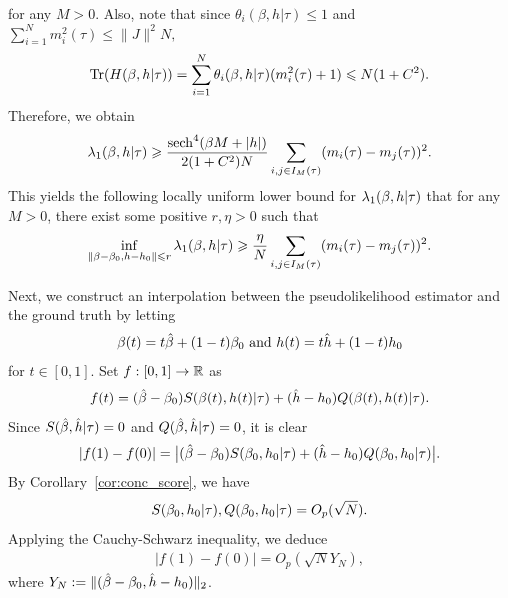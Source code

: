 \documentclass[letterpaper,11pt,reqno]{amsart}
\renewcommand{\le}{\leqslant}
\renewcommand{\ge}{\geqslant}
\renewcommand{\leq}{\leqslant}
\newcommand{\norm}[1]{\left\Vert#1\right\Vert}
\newcommand{\abs}[1]{\left\vert#1\right\vert}
\newcommand{\mvgt}{{\tau}}
\DeclareMathOperator{\sech}{sech}
\begin{document}
for any $M>0$.  Also, note that 
since $\theta_i(\beta,h|\mvgt)\leq 1$ and $\sum_{i=1}^Nm_i^2(\mvgt)\leq \|J\|^2N,$
\[
\mathrm{Tr}(H(\gb,h |\mvgt)) = \sum_{i=1}^N\theta_i(\gb ,h|\mvgt) (m_i^2(\mvgt)+1)\le N(1+C^2).
\]
Therefore, we obtain 
\begin{align}\label{eq:mineig_bd2}
    \gl_1(\gb, h |\mvgt) \ge \frac{\sech^4( \beta M + |h|)}{2(1+ C^2) N}   \sum_{i, j \in I_M(\mvgt)} (m_i(\mvgt)-m_j(\mvgt))^2.
\end{align}
This yields the following locally uniform lower bound for $\gl_1(\gb, h |\mvgt)$ that for any $M>0$, there exist some positive $r,\eta>0$ such that
\begin{align}\label{eq:mineig_uni_bd}
\inf_{\norm{\gb-\gb_0,h-h_0}\le r} \gl_1(\gb, h|\mvgt) \ge \frac{\eta }{N} \sum_{i, j \in I_M(\mvgt)} (m_i(\mvgt)-m_j(\mvgt))^2.
\end{align}

Next, we construct an interpolation between the pseudolikelihood estimator and the ground truth by letting
\begin{align*}
    \beta(t)= t \hat{\beta} + (1-t)   \beta_0\,\,\mbox{and}\,\, h(t)= t  \hat{h} + (1-t)   h_0
\end{align*}
for $t\in [0,1].$
Set $f:[0,1]\to \mathbb{R}$ as
\begin{align*}
 f(t)= (\hat{\gb} - \gb_0)  S(\gb(t), h(t)|\mvgt) + (\hat{h} - h_0) Q(\gb(t), h(t)|\mvgt) .
\end{align*}
Since $S(\hat{\gb},\hat{h}|\mvgt)=0$ and $Q(\hat{\gb},\hat{h}|\mvgt)=0$, it is clear
\begin{align*}
    \abs{f(1)- f(0)} = \bigl|(\hat{\gb} - \gb_0) S(\gb_0, h_0|\mvgt) + (\hat{h} - h_0) Q(\gb_0, h_0|\mvgt) \bigr|.
\end{align*}
By Corollary~\ref{cor:conc_score}, we have 
\[
S(\gb_0,h_0|\mvgt), Q(\gb_0,h_0|\mvgt) = O_p(\sqrt{N}).
\]
Applying the Cauchy-Schwarz inequality, we deduce 
\begin{align}\label{eq:asy-YN}
\abs{f(1) - f(0)} = O_p(\sqrt{N} Y_N),
\end{align}
where $Y_N:=\|(\hat{\beta}-\beta_0, \hat{h}-h_0 )\|_{2}$. 
\end{document}
